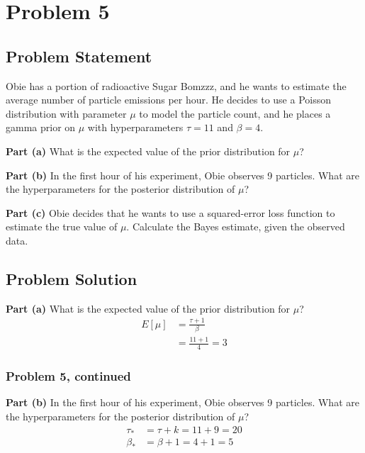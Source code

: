 \documentclass[12pt]{article}
\theoremstyle{definition}
\begin{document}
\newpage
\section*{Problem 5}

\subsection*{Problem Statement}

Obie has a portion of radioactive Sugar Bomzzz, and he wants to estimate the average number of particle emissions per hour. He decides to use a Poisson distribution with parameter $\mu$ to model the particle count, and he places a gamma prior on $\mu$ with hyperparameters $\tau = 11$ and $\beta = 4$.

\bigskip
\noindent
{\bf Part (a)} What is the expected value of the prior distribution for $\mu$?

\bigskip
\noindent
{\bf Part (b)} In the first hour of his experiment, Obie observes 9 particles. What are the hyperparameters for the posterior distribution of $\mu$?

\bigskip
\noindent
{\bf Part (c)} Obie decides that he wants to use a squared-error loss function to estimate the true value of $\mu$. Calculate the Bayes estimate, given the observed data.


\subsection*{Problem Solution}

\noindent
{\bf Part (a)} What is the expected value of the prior distribution for $\mu$?
\begin{align*}
E[\mu] &= \frac{\tau + 1}{\beta}\\
&= \frac{11 + 1}{4} = 3
\end{align*}
\newpage
\subsubsection*{Problem 5, continued}

\noindent
{\bf Part (b)} In the first hour of his experiment, Obie observes 9 particles. What are the hyperparameters for the posterior distribution of $\mu$?
\begin{align*}
\tau_* &= \tau + k = 11 + 9 = 20\\
\beta_* &= \beta + 1 = 4 + 1 = 5\\
\end{align*}
\end{document}
